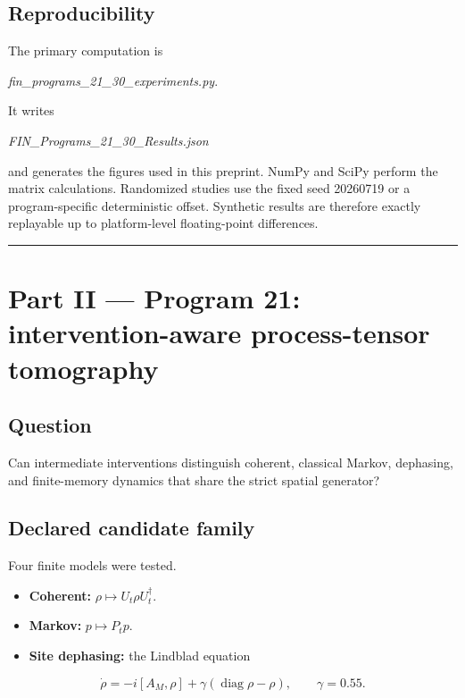 \documentclass[11pt,a4paper,openany]{report}
\begin{document}
\section{Reproducibility}

The primary computation is

\emph{fin\_programs\_21\_30\_experiments.py}.

It writes

\emph{FIN\_Programs\_21\_30\_Results.json}

and generates the figures used in this preprint. NumPy and SciPy perform the matrix calculations. Randomized studies use the fixed seed 20260719 or a program-specific deterministic offset. Synthetic results are therefore exactly replayable up to platform-level floating-point differences.

\par\medskip\hrule\medskip

\chapter{Part II — Program 21: intervention-aware process-tensor tomography}

\section{Question}

Can intermediate interventions distinguish coherent, classical Markov, dephasing, and finite-memory dynamics that share the strict spatial generator?

\section{Declared candidate family}

Four finite models were tested.

\begin{itemize}
\item 
\textbf{Coherent:} \(\rho\mapsto U_t\rho U_t^\dagger\).

\item 
\textbf{Markov:} \(p\mapsto P_tp\).

\item 
\textbf{Site dephasing:} the Lindblad equation

\end{itemize}

\[
\dot\rho=-i[A_M,\rho]+\gamma(\operatorname{diag}\rho-\rho),
\qquad \gamma=0.55.
\]
\end{document}
